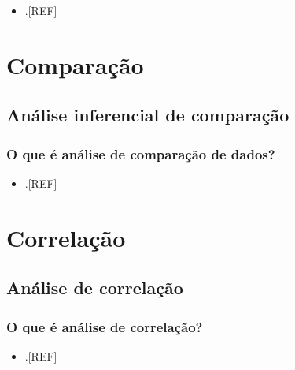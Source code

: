 \documentclass[
]{book}
\providecommand{\tightlist}{%
  \setlength{\itemsep}{0pt}\setlength{\parskip}{0pt}}
\begin{document}
\begin{itemize}
\tightlist
\item
  .{[}REF{]}
\end{itemize}

\hypertarget{analise-comparacao}{%
\chapter{\texorpdfstring{\textbf{Comparação}}{Comparação}}\label{analise-comparacao}}

\hypertarget{analise-inferencial-comparacao}{%
\section{Análise inferencial de comparação}\label{analise-inferencial-comparacao}}

\hypertarget{o-que-uxe9-anuxe1lise-de-comparauxe7uxe3o-de-dados}{%
\subsection{O que é análise de comparação de dados?}\label{o-que-uxe9-anuxe1lise-de-comparauxe7uxe3o-de-dados}}

\begin{itemize}
\tightlist
\item
  .{[}REF{]}
\end{itemize}

\hypertarget{analise-inferencial-correlacao}{%
\chapter{\texorpdfstring{\textbf{Correlação}}{Correlação}}\label{analise-inferencial-correlacao}}

\hypertarget{analise-correlacao}{%
\section{Análise de correlação}\label{analise-correlacao}}

\hypertarget{o-que-uxe9-anuxe1lise-de-correlauxe7uxe3o}{%
\subsection{O que é análise de correlação?}\label{o-que-uxe9-anuxe1lise-de-correlauxe7uxe3o}}

\begin{itemize}
\tightlist
\item
  .{[}REF{]}
\end{itemize}
\end{document}
